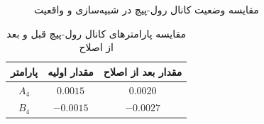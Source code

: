 \begin{figure}[H]
	\centering
	\caption{مقايسه وضعیت کانال رول-پیچ در شبیه‌سازی و واقعیت}
\end{figure}

\vspace{1.5cm}
\begin{table}[H]
	\begin{center}
		\begin{tabular}{ccc}\hline
	پارامتر & مقدار اولیه  & مقدار بعد از اصلاح
	\\ \hline
	$A_4$  & $0.0015$ & $0.0020$ \\
	$B_4$  & $-0.0015$ & $-0.0027$ \\ \hline
\end{tabular}
	\end{center}
\caption {مقايسه پارامترهای کانال رول-پیچ قبل و بعد از اصلاح}
\end{table}


